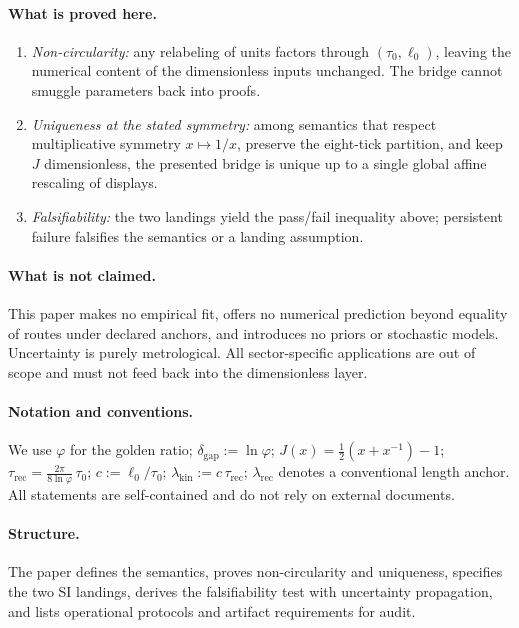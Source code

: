 \documentclass[11pt]{article}
\begin{document}
\paragraph{What is proved here.}
\begin{enumerate}
  \item \emph{Non-circularity:} any relabeling of units factors through \((\tau_{0},\ell_{0})\), leaving the numerical content of the dimensionless inputs unchanged. The bridge cannot smuggle parameters back into proofs.
  \item \emph{Uniqueness at the stated symmetry:} among semantics that respect multiplicative symmetry \(x\mapsto 1/x\), preserve the eight-tick partition, and keep \(J\) dimensionless, the presented bridge is unique up to a single global affine rescaling of displays.
  \item \emph{Falsifiability:} the two landings yield the pass/fail inequality above; persistent failure falsifies the semantics or a landing assumption.
\end{enumerate}

\paragraph{What is not claimed.}
This paper makes no empirical fit, offers no numerical prediction beyond equality of routes under declared anchors, and introduces no priors or stochastic models. Uncertainty is purely metrological. All sector-specific applications are out of scope and must not feed back into the dimensionless layer.

\paragraph{Notation and conventions.}
We use \(\varphi\) for the golden ratio; \(\delta_{\mathrm{gap}}:=\ln\varphi\); \(J(x)=\tfrac12(x+x^{-1})-1\); \(\tau_{\mathrm{rec}}=\frac{2\pi}{8\ln\varphi}\,\tau_{0}\); \(c:=\ell_{0}/\tau_{0}\); \(\lambda_{\mathrm{kin}}:=c\,\tau_{\mathrm{rec}}\); \(\lambda_{\mathrm{rec}}\) denotes a conventional length anchor. All statements are self-contained and do not rely on external documents.

\paragraph{Structure.}
The paper defines the semantics, proves non-circularity and uniqueness, specifies the two SI landings, derives the falsifiability test with uncertainty propagation, and lists operational protocols and artifact requirements for audit.
\end{document}
